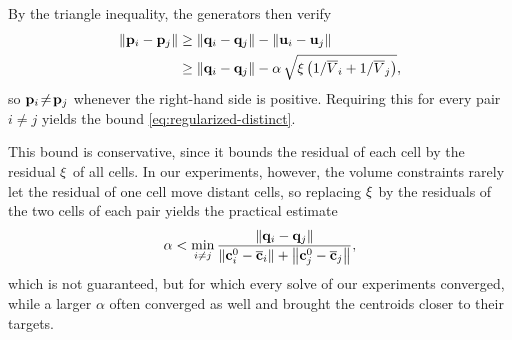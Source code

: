 \documentclass[main.tex]{subfiles}
\begin{document}
By the triangle inequality, the generators then verify
\begin{equation}
  \begin{aligned}
    \left\lVert \mathbf{p}_i - \mathbf{p}_j \right\rVert
    &\ge \left\lVert \mathbf{q}_i - \mathbf{q}_j \right\rVert - \left\lVert \mathbf{u}_i - \mathbf{u}_j \right\rVert \\
    &\ge \left\lVert \mathbf{q}_i - \mathbf{q}_j \right\rVert - \alpha\,\sqrt{\xi\,\bigl(1/\overline{V}_i + 1/\overline{V}_j\bigr)} ,
  \end{aligned}
\end{equation}
so $\mathbf{p}_i \!\neq\! \mathbf{p}_j$ whenever the right-hand side is positive.
Requiring this for every pair $i \!\neq\! j$ yields the bound \eqref{eq:regularized-distinct}.

This bound is conservative, since it bounds the residual of each cell by the residual $\xi$ of all cells.
In our experiments, however, the volume constraints rarely let the residual of one cell move distant cells, so replacing $\xi$ by the residuals of the two cells of each pair yields the practical estimate
\begin{equation}
  \alpha < \min_{i \neq j} \frac{\left\lVert \mathbf{q}_i - \mathbf{q}_j \right\rVert}{\left\lVert \mathbf{c}^0_i - \overline{\mathbf{c}}_i \right\rVert + \left\lVert \mathbf{c}^0_j - \overline{\mathbf{c}}_j \right\rVert} ,
  \label{eq:regularized-practical}
\end{equation}
which is not guaranteed, but for which every solve of our experiments converged, while a larger $\alpha$ often converged as well and brought the centroids closer to their targets.
\end{document}
